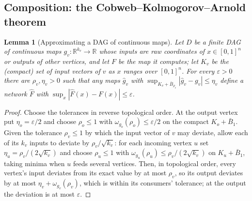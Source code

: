 \documentclass[11pt]{article}
\newtheorem{lemma}[theorem]{Lemma}
\theoremstyle{definition}
\theoremstyle{remark}
\newcommand{\R}{\mathbb{R}}
\begin{document}
\subsection{Composition: the Cobweb--Kolmogorov--Arnold theorem}

\begin{lemma}[Approximating a DAG of continuous maps]\label{lem:dag}
Let $D$ be a finite DAG of continuous maps $g_v:\R^{k_v}\to\R$ whose inputs are raw
coordinates of $x\in[0,1]^n$ or outputs of other vertices, and let $F$ be the map it
computes; let $K_v$ be the (compact) set of input vectors of $v$ as $x$ ranges over
$[0,1]^n$.  For every $\varepsilon>0$ there are $\rho_v,\eta_v>0$ such that any maps
$\hat g_v$ with $\sup_{K_v+\bar B_{\rho_v}}|\hat g_v-g_v|\le\eta_v$ define a network
$\hat F$ with $\sup_x|\hat F(x)-F(x)|\le\varepsilon$.
\end{lemma}
\begin{proof}
Choose the tolerances in reverse topological order.  At the output vertex put
$\eta_o=\varepsilon/2$ and choose $\rho_o\le1$ with
$\omega_{g_o}(\rho_o)\le\varepsilon/2$ on the compact $K_o+\bar B_1$.  Given the
tolerance $\rho_v\le1$ by which the input vector of $v$ may deviate, allow each of its
$k_v$ inputs to deviate by $\rho_v/\sqrt{k_v}$: for each incoming vertex $u$ set
$\eta_u=\rho_v/(2\sqrt{k_v})$ and choose $\rho_u\le1$ with
$\omega_{g_u}(\rho_u)\le\rho_v/(2\sqrt{k_v})$ on $K_u+\bar B_1$, taking minima when $u$
feeds several vertices.  Then, in topological order, every vertex's input deviates from
its exact value by at most $\rho_v$, so its output deviates by at most
$\eta_v+\omega_{g_v}(\rho_v)$, which is within its consumers' tolerance; at the output
the deviation is at most $\varepsilon$.
\end{proof}
\end{document}

